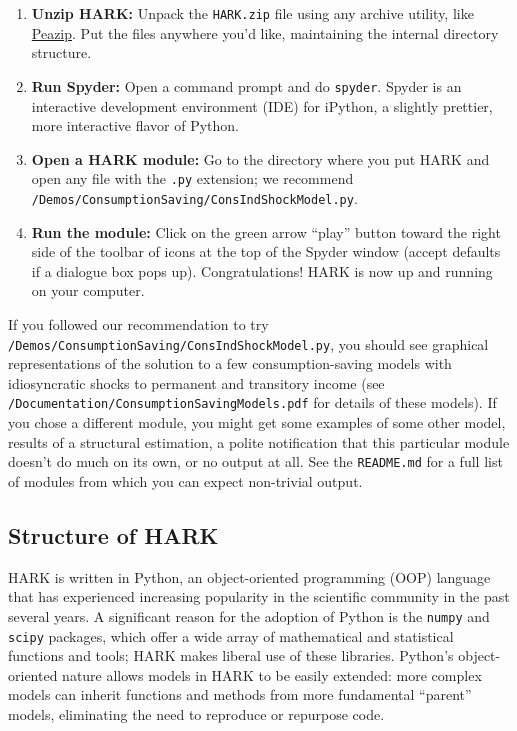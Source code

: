 \documentclass[12pt,titlepage,letterpaper]{econtex}
\begin{document}
{\begin{enumerate}
\item \textbf{Unzip HARK:} Unpack the \texttt{HARK.zip} file using any archive utility, like \href{http://www.peazip.org/}{Peazip}.  Put the files anywhere you'd like, maintaining the internal directory structure.

\item \textbf{Run Spyder:} Open a command prompt and do \texttt{spyder}.  Spyder is an interactive development environment (IDE) for iPython, a slightly prettier, more interactive flavor of Python.

\item \textbf{Open a HARK module:} Go to the directory where you put HARK and open any file with the \texttt{.py} extension; we recommend \texttt{/Demos/ConsumptionSaving/ConsIndShockModel.py}.

\item \textbf{Run the module:} Click on the green arrow ``play'' button toward the right side of the toolbar of icons at the top of the Spyder window (accept defaults if a dialogue box pops up).  Congratulations! HARK is now up and running on your computer.
\end{enumerate}

If you followed our recommendation to try \texttt{/Demos/ConsumptionSaving/ConsIndShockModel.py}, you should see graphical representations of the solution to a few consumption-saving models with idiosyncratic shocks to permanent and transitory income (see \texttt{/Documentation/ConsumptionSavingModels.pdf} for details of these models).  If you chose a different module, you might get some examples of some other model, results of a structural estimation, a polite notification that this particular module doesn't do much on its own, or no output at all.  See the \texttt{README.md} for a full list of modules from which you can expect non-trivial output.

\subsection{Structure of HARK}\label{sec:StructureOfHARK}

HARK is written in Python, an object-oriented programming (OOP) language that has experienced increasing popularity in the scientific community in the past several years.  A significant reason for the adoption of Python is the \texttt{numpy} and \texttt{scipy} packages, which offer a wide array of mathematical and statistical functions and tools; HARK makes liberal use of these libraries.  Python's object-oriented nature allows models in HARK to be easily extended: more complex models can inherit functions and methods from more fundamental ``parent'' models, eliminating the need to reproduce or repurpose code.

}
\end{document}
